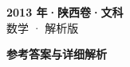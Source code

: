 \documentclass[zihao=-4, a4paper]{ctexart}
\begin{document}
\begin{center}
  {\Large\bfseries 2013 年·陕西卷·文科}\\[4pt]
  {\large 数学 · 解析版}
\end{center}
\medskip
{}

\clearpage
{}
\begin{center}{\Large\bfseries 参考答案与详细解析}\end{center}
\medskip

\end{document}

